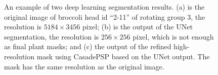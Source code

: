 \begin{figure}[htb]
  \begin{center}
  \end{center}
  \caption[Two deep learning segmentation results]{
    An example of two deep learning segmentation results. (a) is the original image of broccoli head id ``2-11'' of rotating group 3, the resolution is $5184 \times 3456$ pixel; (b) is the output of the UNet segmentation, the resolution is $256 \times 256$ pixel, which is not enough as final plant masks; and (c) the output of the refined high-resolution mask using CasadePSP based on the UNet output. The mask has the same resolution as the original image.
  }
  \label{fig:des4}
\end{figure}
